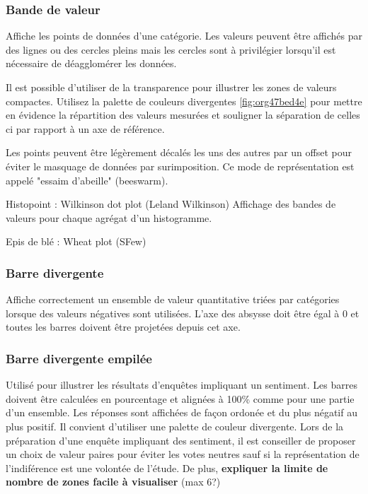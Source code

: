\documentclass[a4paper,12pt]{article}
\begin{document}
\begin{multicols}{2}
\subsubsection{Bande de valeur}
\label{sec:orgbd8fdd5}
Affiche les points de données d'une catégorie.\autocite{jonathanschwabishDistribution2021} Les valeurs peuvent être affichés par des lignes ou des cercles pleins mais les cercles sont à privilégier lorsqu'il est nécessaire de déagglomérer les données.

Il est possible d'utiliser de la transparence pour illustrer les zones de valeurs compactes. \autocite{jonathanschwabishDistribution2021} Utilisez la palette de couleurs divergentes \ref{fig:org47bed4e} pour mettre en évidence la répartition des valeurs mesurées et souligner la séparation de celles ci par rapport à un axe de référence.\autocite{jonathanschwabishDistribution2021}

Les points peuvent être légèrement décalés les uns des autres par un offset pour éviter le masquage de données par surimposition. Ce mode de représentation est appelé "essaim d'abeille" (beeswarm). \autocite{jonathanschwabishDistribution2021}

Histopoint : Wilkinson dot plot (Leland Wilkinson) Affichage des bandes de valeurs pour chaque agrégat d'un histogramme.\autocite{jonathanschwabishDistribution2021}

Epis de blé : Wheat plot (SFew)
\subsubsection{Barre divergente}
\label{sec:orgd9828a9}
Affiche correctement un ensemble de valeur quantitative triées par catégories lorsque des valeurs négatives sont utilisées. \autocite{alansmithLexiqueVisuel} L'axe des absysse doit être égal à 0 et toutes les barres doivent être projetées depuis cet axe.
\subsubsection{Barre divergente empilée}
\label{sec:orga0f1dbd}
Utilisé pour illustrer les résultats d'enquêtes impliquant un sentiment. \autocite{alansmithLexiqueVisuel} Les barres doivent être calculées en pourcentage et alignées à 100\% comme pour une partie d'un ensemble. Les réponses sont affichées de façon ordonée et du plus négatif au plus positif. Il convient d'utiliser une palette de couleur divergente. Lors de la préparation d'une enquête impliquant des sentiment, il est conseiller de proposer un choix de valeur paires pour éviter les votes neutres sauf si la représentation de l'indiférence est une volontée de l'étude. De plus, \textbf{expliquer la limite de nombre de zones facile à visualiser} (max 6?)

\end{multicols}
\end{document}
